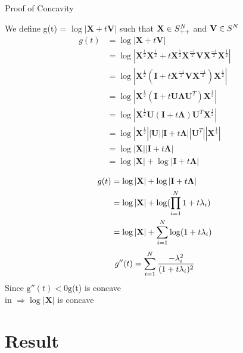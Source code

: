 \documentclass{beamer}
\begin{document}
\begin{frame}{Proof of Concavity}

We define g(t) = $\log|\mathbf{X}+t\mathbf{V}|$ such that $\mathbf{X}\in\mathnormal{S}_{++}^N$ and $\mathbf{V}\in\mathnormal{S}^N$
\begin{align*}
g(t) &= \log |\mathbf{X}+t\mathbf{V}|\\
&= \log|\mathbf{X}^{\frac{1}{2}}\mathbf{X}^{\frac{1}{2}}+t\mathbf{X}^{\frac{1}{2}}\mathbf{X}^{\frac{-1}{2}}\mathbf{V}\mathbf{X}^{\frac{-1}{2}}\mathbf{X}^{\frac{1}{2}}|\\
&= \log|\mathbf{X}^{\frac{1}{2}}(\mathbf{I} + t\mathbf{X}^{\frac{-1}{2}}\mathbf{V}\mathbf{X}^{\frac{-1}{2}})\mathbf{X}^{\frac{1}{2}}|\\
&= \log|\mathbf{X}^{\frac{1}{2}}(\mathbf{I} + t\mathbf{U}\mathbf{\Lambda}\mathbf{U}^{T})\mathbf{X}^{\frac{1}{2}}|\\
&= \log|\mathbf{X}^{\frac{1}{2}}\mathbf{U}(\mathbf{I} + t\mathbf{\Lambda})\mathbf{U}^{T}\mathbf{X}^{\frac{1}{2}}|\\
&= \log|\mathbf{X}^{\frac{1}{2}}||\mathbf{U}||\mathbf{I} + t\mathbf{\Lambda}||\mathbf{U}^{T}||\mathbf{X}^{\frac{1}{2}}|\\
&= \log|\mathbf{X}||\mathbf{I}+t\mathbf{\Lambda}|\\
&= \log|\mathbf{X}|+\log|\mathbf{I}+t\mathbf{\Lambda}|
\end{align*}
\end{frame}

\begin{frame}{}
\begin{align*}
    g(t) &= \log|\mathbf{X}|+\log|\mathbf{I}+t\mathbf{\Lambda}|\\
&= \log|\mathbf{X}|+\log(\prod_{i=1}^{N}1+t\mathnormal{\lambda}_i)\\
&= \log|\mathbf{X}|+\sum_{i=1}^{N}\log(1+t\mathnormal{\lambda}_i)
\end{align*}
$$g''(t) = \sum_{i=1}^{N}\frac{-\mathnormal{\lambda}_i^2}{(1+t\mathnormal{\lambda}_i)^2}$$
Since $\mathrm{g}''(t)< 0 \mathrm{g}$(t) is concave\\
 in
$\Rightarrow \log|\mathbf{X}|$ is concave     
\end{frame}

\section{Result}
\end{document}
